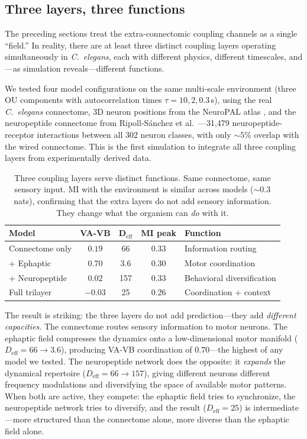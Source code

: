 \documentclass[12pt]{article}
\newcommand{\Deff}{D_{\mathrm{eff}}}
\begin{document}
\subsection{Three layers, three functions}
\label{sec:trilayer}

The preceding sections treat the extra-connectomic coupling channels as a single ``field.'' In reality, there are at least three distinct coupling layers operating simultaneously in \textit{C.~elegans}, each with different physics, different timescales, and---as simulation reveals---different functions.

We tested four model configurations on the same multi-scale environment (three OU components with autocorrelation times $\tau = 10, 2, 0.3$\,s), using the real \textit{C.~elegans} connectome, 3D neuron positions from the NeuroPAL atlas \cite{yemini2021}, and the neuropeptide connectome from Ripoll-S\'anchez et al.\ \cite{ripollsanchez2023}---31{,}479 neuropeptide-receptor interactions between all 302 neuron classes, with only ${\sim}5\%$ overlap with the wired connectome. This is the first simulation to integrate all three coupling layers from experimentally derived data.

\begin{table}[H]
\centering
\caption{Three coupling layers serve distinct functions. Same connectome, same sensory input. MI with the environment is similar across models (${\sim}0.3$ nats), confirming that the extra layers do not add sensory information. They change what the organism can \textit{do} with it.}
\label{tab:trilayer}
\begin{tabular}{l c c c l}
\toprule
\textbf{Model} & \textbf{VA-VB} & $\boldsymbol{\Deff}$ & \textbf{MI peak} & \textbf{Function} \\
\midrule
Connectome only & $0.19$ & 66 & 0.33 & Information routing \\
+ Ephaptic & $\mathbf{0.70}$ & $\mathbf{3.6}$ & 0.30 & Motor coordination \\
+ Neuropeptide & $0.02$ & 157 & 0.33 & Behavioral diversification \\
Full trilayer & $-0.03$ & 25 & 0.26 & Coordination + context \\
\bottomrule
\end{tabular}
\end{table}

The result is striking: the three layers do not add prediction---they add \textit{different capacities}. The connectome routes sensory information to motor neurons. The ephaptic field compresses the dynamics onto a low-dimensional motor manifold ($\Deff = 66 \to 3.6$), producing VA-VB coordination of $0.70$---the highest of any model we tested. The neuropeptide network does the opposite: it \textit{expands} the dynamical repertoire ($\Deff = 66 \to 157$), giving different neurons different frequency modulations and diversifying the space of available motor patterns. When both are active, they compete: the ephaptic field tries to synchronize, the neuropeptide network tries to diversify, and the result ($\Deff = 25$) is intermediate---more structured than the connectome alone, more diverse than the ephaptic field alone.
\end{document}
